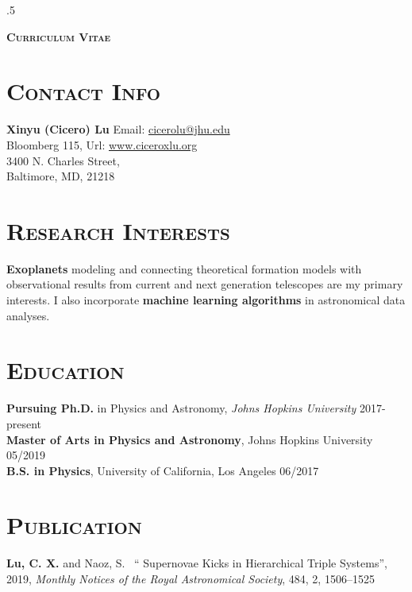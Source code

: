 \documentclass[line, margin]{res}
\begin{document}
 \moveleft.5\hoffset\centerline{\LARGE\bf \textsc {Curriculum Vitae}}
 
\begin{resume}
\section{\textsc{Contact Info}}
\textbf{\Large{Xinyu (Cicero) Lu}} \hfill Email: \href{mailto:cicerolu@jhu.edu}{cicerolu@jhu.edu}\\
	 Bloomberg 115, \hfill Url: \href{www.ciceroxlu.org}{www.ciceroxlu.org} \\
	 3400 N. Charles Street, \\
	 Baltimore, MD, 21218 
	 
\section{\textsc{Research Interests}}
\textbf{Exoplanets} modeling and connecting theoretical formation models with observational results from current and next generation telescopes are my primary interests. I also incorporate \textbf{machine learning algorithms} in astronomical data analyses. 

\section{\textsc{Education}} 
\textbf{Pursuing Ph.D.} in Physics and Astronomy, \emph{Johns Hopkins University} \hfill 2017-present\\
\textbf{Master of Arts in Physics and Astronomy}, Johns Hopkins University \hfill  05/2019\\
\textbf{B.S. in Physics}, University of California, Los Angeles \hfill  06/2017\\


\section{\textsc{Publication}}

\textbf{Lu, C. X.} and Naoz, S. ~\enquote{ Supernovae Kicks in Hierarchical Triple Systems}, 2019, \textsl{Monthly Notices of the Royal Astronomical Society},  484, 2, 1506--1525


\end{resume}
\end{document}
